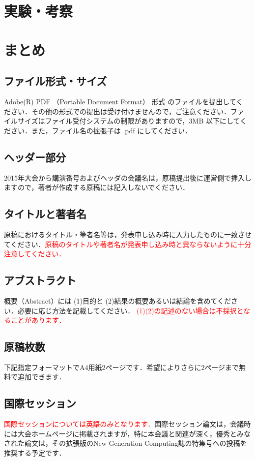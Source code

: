 \section{実験・考察}

\section{まとめ}


\subsection{ファイル形式・サイズ}
Adobe(R) PDF （Portable Document Format） 形式 のファイルを提出してく
ださい．その他の形式での提出は受け付けませんので，ご注意ください．ファ
イルサイズはファイル受付システムの制限がありますので，3MB 以下にしてく
ださい．また，ファイル名の拡張子は .pdf にしてください．

\subsection{ヘッダー部分}
2015年大会から講演番号およびヘッダの会議名は，原稿提出後に運営側で挿入しますので，著者が作成する原稿には記入しないでください．

\subsection{タイトルと著者名}
原稿におけるタイトル・筆者名等は，発表申し込み時に入力したものに一致させてください．\textcolor{red}{原稿のタイトルや著者名が発表申し込み時と異ならないように十分注意してください．}

\subsection{アブストラクト}
概要（Abstract）には  (1)目的と (2)結果の概要あるいは結論を含めてください．必要に応じ方法を記載してください．
\textcolor{red}{(1)(2)の記述のない場合は不採択となることがあります．}

\subsection{原稿枚数}
下記指定フォーマットでA4用紙2ページです．希望によりさらに2ページまで無料で追加できます．

\subsection{国際セッション}
\textcolor{red}{国際セッションについては英語のみとなります．}国際セッション論文は，会議時には大会ホームページに掲載されますが，特に本会議と関連が深く，優秀とみなされた論文は，その拡張版のNew Generation Computing誌の特集号への投稿を推奨する予定です．


